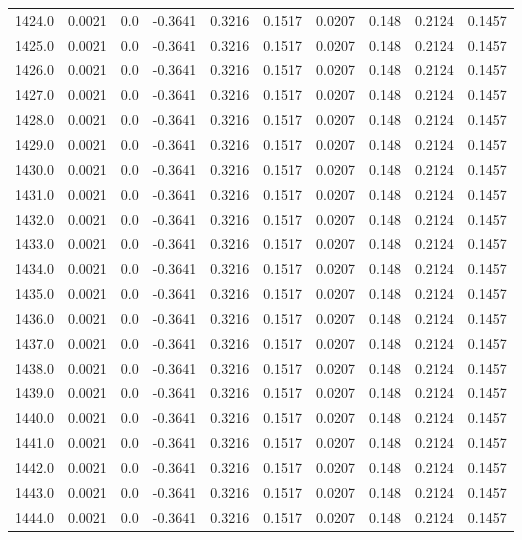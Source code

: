 \begin{longtable}{lrrrrrrrrr}
1424.0 & 0.0021 & 0.0 & -0.3641 & 0.3216 & 0.1517 & 0.0207 & 0.148 & 0.2124 & 0.1457 \\
1425.0 & 0.0021 & 0.0 & -0.3641 & 0.3216 & 0.1517 & 0.0207 & 0.148 & 0.2124 & 0.1457 \\
1426.0 & 0.0021 & 0.0 & -0.3641 & 0.3216 & 0.1517 & 0.0207 & 0.148 & 0.2124 & 0.1457 \\
1427.0 & 0.0021 & 0.0 & -0.3641 & 0.3216 & 0.1517 & 0.0207 & 0.148 & 0.2124 & 0.1457 \\
1428.0 & 0.0021 & 0.0 & -0.3641 & 0.3216 & 0.1517 & 0.0207 & 0.148 & 0.2124 & 0.1457 \\
1429.0 & 0.0021 & 0.0 & -0.3641 & 0.3216 & 0.1517 & 0.0207 & 0.148 & 0.2124 & 0.1457 \\
1430.0 & 0.0021 & 0.0 & -0.3641 & 0.3216 & 0.1517 & 0.0207 & 0.148 & 0.2124 & 0.1457 \\
1431.0 & 0.0021 & 0.0 & -0.3641 & 0.3216 & 0.1517 & 0.0207 & 0.148 & 0.2124 & 0.1457 \\
1432.0 & 0.0021 & 0.0 & -0.3641 & 0.3216 & 0.1517 & 0.0207 & 0.148 & 0.2124 & 0.1457 \\
1433.0 & 0.0021 & 0.0 & -0.3641 & 0.3216 & 0.1517 & 0.0207 & 0.148 & 0.2124 & 0.1457 \\
1434.0 & 0.0021 & 0.0 & -0.3641 & 0.3216 & 0.1517 & 0.0207 & 0.148 & 0.2124 & 0.1457 \\
1435.0 & 0.0021 & 0.0 & -0.3641 & 0.3216 & 0.1517 & 0.0207 & 0.148 & 0.2124 & 0.1457 \\
1436.0 & 0.0021 & 0.0 & -0.3641 & 0.3216 & 0.1517 & 0.0207 & 0.148 & 0.2124 & 0.1457 \\
1437.0 & 0.0021 & 0.0 & -0.3641 & 0.3216 & 0.1517 & 0.0207 & 0.148 & 0.2124 & 0.1457 \\
1438.0 & 0.0021 & 0.0 & -0.3641 & 0.3216 & 0.1517 & 0.0207 & 0.148 & 0.2124 & 0.1457 \\
1439.0 & 0.0021 & 0.0 & -0.3641 & 0.3216 & 0.1517 & 0.0207 & 0.148 & 0.2124 & 0.1457 \\
1440.0 & 0.0021 & 0.0 & -0.3641 & 0.3216 & 0.1517 & 0.0207 & 0.148 & 0.2124 & 0.1457 \\
1441.0 & 0.0021 & 0.0 & -0.3641 & 0.3216 & 0.1517 & 0.0207 & 0.148 & 0.2124 & 0.1457 \\
1442.0 & 0.0021 & 0.0 & -0.3641 & 0.3216 & 0.1517 & 0.0207 & 0.148 & 0.2124 & 0.1457 \\
1443.0 & 0.0021 & 0.0 & -0.3641 & 0.3216 & 0.1517 & 0.0207 & 0.148 & 0.2124 & 0.1457 \\
1444.0 & 0.0021 & 0.0 & -0.3641 & 0.3216 & 0.1517 & 0.0207 & 0.148 & 0.2124 & 0.1457 \\

\end{longtable}
